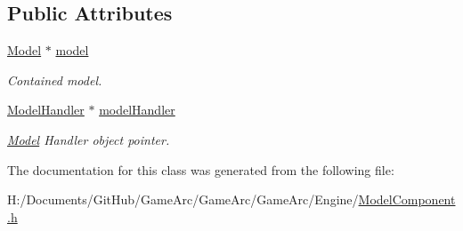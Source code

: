 \subsection*{Public Attributes}
\begin{DoxyCompactItemize}
\item 
\hypertarget{class_model_component_a3dd9367267556f8aeb6abca61ee9dc6b}{\hyperlink{class_model}{Model} $\ast$ \hyperlink{class_model_component_a3dd9367267556f8aeb6abca61ee9dc6b}{model}}\label{class_model_component_a3dd9367267556f8aeb6abca61ee9dc6b}

\begin{DoxyCompactList}\small\item\em Contained model. \end{DoxyCompactList}\item 
\hypertarget{class_model_component_a62105902fd46bfa4dd3f3fa34050ab47}{\hyperlink{class_model_handler}{Model\+Handler} $\ast$ \hyperlink{class_model_component_a62105902fd46bfa4dd3f3fa34050ab47}{model\+Handler}}\label{class_model_component_a62105902fd46bfa4dd3f3fa34050ab47}

\begin{DoxyCompactList}\small\item\em \hyperlink{class_model}{Model} Handler object pointer. \end{DoxyCompactList}\end{DoxyCompactItemize}


The documentation for this class was generated from the following file\+:\begin{DoxyCompactItemize}
\item 
H\+:/\+Documents/\+Git\+Hub/\+Game\+Arc/\+Game\+Arc/\+Game\+Arc/\+Engine/\hyperlink{_model_component_8h}{Model\+Component.\+h}\end{DoxyCompactItemize}
